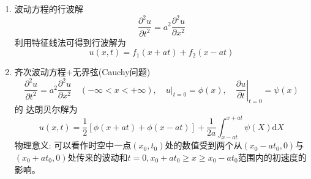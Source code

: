 \documentclass[UTF8,9pt]{ctexart}
\renewcommand{\r}[1]{{\color{red} #1}}
\begin{document}
\begin{enumerate}
\item 波动方程的行波解
$$ 
\frac{\partial^{2} u}{\partial t^{2}}=a^{2} \frac{\partial^{2} u}{\partial x^{2}}
$$利用特征线法可得到行波解为
$$u(x,t)=f_{1}(x+a t)+f_{2}(x-a t)$$
\item 齐次波动方程+无界弦(Cauchy问题)
$$ 
\frac{\partial^{2} u}{\partial t^{2}}=a^{2} \frac{\partial^{2} u}{\partial x^{2}} \quad(-\infty<x<+\infty), \quad\left.u\right|_{t=0}=\phi(x), \quad\left.\frac{\partial u}{\partial t}\right|_{t=0}=\psi(x)
$$
的\r{达朗贝尔解}为$$ u(x,t)=
\frac{1}{2}[\phi(x+a t)+\phi(x-a t)]+\frac{1}{2 a} \int_{x-a t}^{x+a t} \psi(X) \mathrm{d} X
$$
物理意义: 可以看作时空中一点$ (x_0, t_0) $处的数值受到两个从$ (x_0−at_0, 0) $与$ (x_0+at_0, 0) $处传来的波动和$t = 0, x_0+at_0 ≥ x ≥ x_0−at_0$范围内的初速度的影响。


\end{enumerate}
\end{document}
